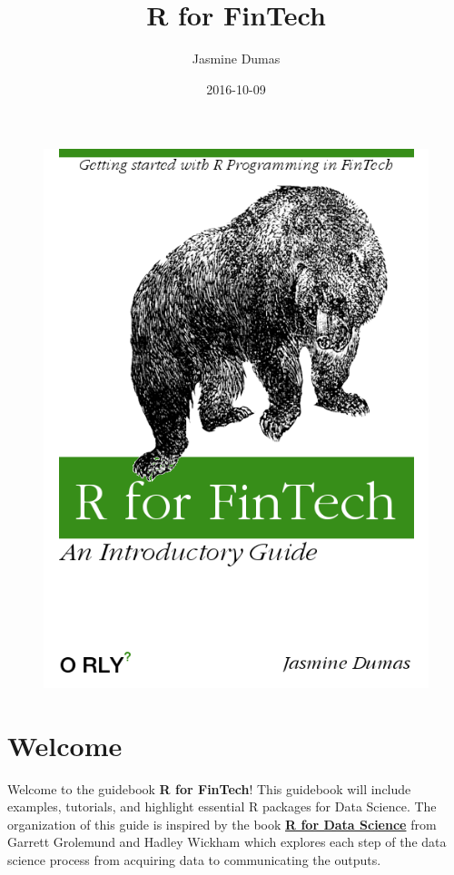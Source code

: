 \documentclass[]{book}
\title{R for FinTech}
\author{Jasmine Dumas}
\date{2016-10-09}
\begin{document}
\maketitle

{
\setcounter{tocdepth}{1}
\tableofcontents
}
\begin{figure}[htbp]
\centering
\includegraphics{cover.png}
\caption{}
\end{figure}

\chapter{Welcome}\label{welcome}

Welcome to the guidebook \textbf{R for FinTech}! This guidebook will
include examples, tutorials, and highlight essential R packages for Data
Science. The organization of this guide is inspired by the book
\href{http://r4ds.had.co.nz/}{\textbf{R for Data Science}} from Garrett
Grolemund and Hadley Wickham which explores each step of the data
science process from acquiring data to communicating the outputs.
\end{document}
